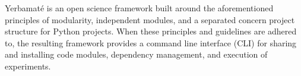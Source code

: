 


Yerbamaté is an open science framework built around the aforementioned principles of modularity, independent modules, and a separated concern project structure for Python projects. When these principles and guidelines are adhered to, the resulting framework provides a command line interface (CLI) for sharing and installing code modules, dependency management, and execution of experiments. 


